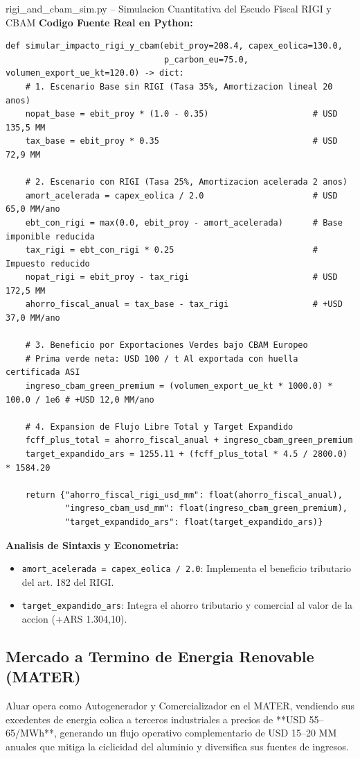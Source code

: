 \documentclass[10pt,a4paper]{article}
\theoremstyle{definition}
\begin{document}
\begin{codebox}{{rigi\_and\_cbam\_sim.py -- Simulacion Cuantitativa del Escudo Fiscal RIGI y CBAM}}
\textbf{Codigo Fuente Real en Python:}
\begin{verbatim}
def simular_impacto_rigi_y_cbam(ebit_proy=208.4, capex_eolica=130.0,
                                p_carbon_eu=75.0, volumen_export_ue_kt=120.0) -> dict:
    # 1. Escenario Base sin RIGI (Tasa 35%, Amortizacion lineal 20 anos)
    nopat_base = ebit_proy * (1.0 - 0.35)                     # USD 135,5 MM
    tax_base = ebit_proy * 0.35                               # USD 72,9 MM
    
    # 2. Escenario con RIGI (Tasa 25%, Amortizacion acelerada 2 anos)
    amort_acelerada = capex_eolica / 2.0                      # USD 65,0 MM/ano
    ebt_con_rigi = max(0.0, ebit_proy - amort_acelerada)      # Base imponible reducida
    tax_rigi = ebt_con_rigi * 0.25                            # Impuesto reducido
    nopat_rigi = ebit_proy - tax_rigi                         # USD 172,5 MM
    ahorro_fiscal_anual = tax_base - tax_rigi                 # +USD 37,0 MM/ano
    
    # 3. Beneficio por Exportaciones Verdes bajo CBAM Europeo
    # Prima verde neta: USD 100 / t Al exportada con huella certificada ASI
    ingreso_cbam_green_premium = (volumen_export_ue_kt * 1000.0) * 100.0 / 1e6 # +USD 12,0 MM/ano
    
    # 4. Expansion de Flujo Libre Total y Target Expandido
    fcff_plus_total = ahorro_fiscal_anual + ingreso_cbam_green_premium
    target_expandido_ars = 1255.11 + (fcff_plus_total * 4.5 / 2800.0) * 1584.20
    
    return {"ahorro_fiscal_rigi_usd_mm": float(ahorro_fiscal_anual),
            "ingreso_cbam_usd_mm": float(ingreso_cbam_green_premium),
            "target_expandido_ars": float(target_expandido_ars)}
\end{verbatim}
\textbf{Analisis de Sintaxis y Econometria:}
\begin{itemize}
    \item \texttt{amort\_acelerada = capex\_eolica / 2.0}: Implementa el beneficio tributario del art. 182 del RIGI.
    \item \texttt{target\_expandido\_ars}: Integra el ahorro tributario y comercial al valor de la accion (+ARS 1.304,10).
\end{itemize}
\end{codebox}

\subsection{Mercado a Termino de Energia Renovable (MATER)}
Aluar opera como Autogenerador y Comercializador en el MATER, vendiendo sus excedentes de energia eolica a terceros industriales a precios de **USD 55--65/MWh**, generando un flujo operativo complementario de USD 15--20 MM anuales que mitiga la ciclicidad del aluminio y diversifica sus fuentes de ingresos.
\clearpage
\end{document}
